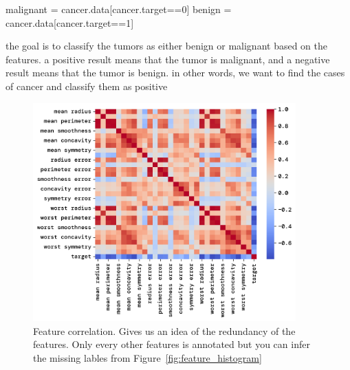 \documentclass[twoside,11pt]{report}
\begin{document}
    malignant = cancer.data[cancer.target==0]
    benign = cancer.data[cancer.target==1]

    the goal is to classify the tumors as either benign or malignant based on the features.
    a positive result means that the tumor is malignant, and a negative result means that the tumor is benign.
    in other words, we want to find the cases of cancer and classify them as positive
    \begin{figure}[h]
        \begin{center}
            \includegraphics[width=0.9\textwidth]{../runsAndFigures/feature_correlation.png}
        \end{center}
        \caption{Feature correlation. Gives us an idea of the redundancy of the features.
            Only every other features is annotated but you can infer the missing lables 
        from Figure~\ref{fig:feature_histogram}}\label{fig:feature_correlation}
    \end{figure}
\end{document}
